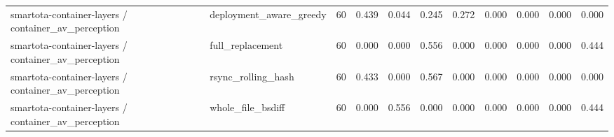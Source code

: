 \begin{table}
{\begin{tabular}{llrrrrrrrrr}
smartota-container-layers / container_av_perception & deployment_aware_greedy & 60 & 0.439 & 0.044 & 0.245 & 0.272 & 0.000 & 0.000 & 0.000 & 0.000 \\
smartota-container-layers / container_av_perception & full_replacement & 60 & 0.000 & 0.000 & 0.556 & 0.000 & 0.000 & 0.000 & 0.000 & 0.444 \\
smartota-container-layers / container_av_perception & rsync_rolling_hash & 60 & 0.433 & 0.000 & 0.567 & 0.000 & 0.000 & 0.000 & 0.000 & 0.000 \\
smartota-container-layers / container_av_perception & whole_file_bsdiff & 60 & 0.000 & 0.556 & 0.000 & 0.000 & 0.000 & 0.000 & 0.000 & 0.444 \\
\bottomrule
\end{tabular}
}
\end{table}
